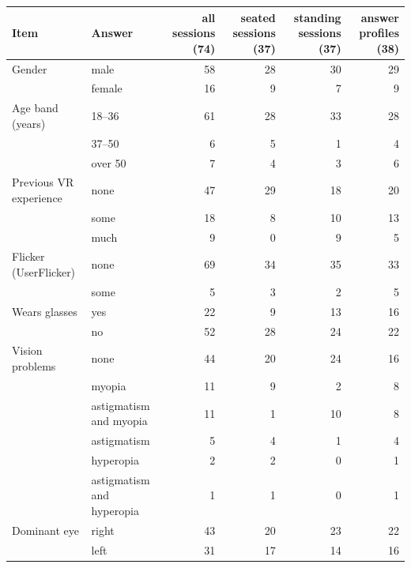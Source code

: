 \begin{tabular}{llrrrr}
\toprule
Item & Answer & all sessions (74) & seated sessions (37) & standing sessions (37) & answer profiles (38) \\
\midrule
Gender & male & 58 & 28 & 30 & 29 \\
 & female & 16 & 9 & 7 & 9 \\
Age band (years) & 18–36 & 61 & 28 & 33 & 28 \\
 & 37–50 & 6 & 5 & 1 & 4 \\
 & over 50 & 7 & 4 & 3 & 6 \\
Previous VR experience & none & 47 & 29 & 18 & 20 \\
 & some & 18 & 8 & 10 & 13 \\
 & much & 9 & 0 & 9 & 5 \\
Flicker (UserFlicker) & none & 69 & 34 & 35 & 33 \\
 & some & 5 & 3 & 2 & 5 \\
Wears glasses & yes & 22 & 9 & 13 & 16 \\
 & no & 52 & 28 & 24 & 22 \\
Vision problems & none & 44 & 20 & 24 & 16 \\
 & myopia & 11 & 9 & 2 & 8 \\
 & astigmatism and myopia & 11 & 1 & 10 & 8 \\
 & astigmatism & 5 & 4 & 1 & 4 \\
 & hyperopia & 2 & 2 & 0 & 1 \\
 & astigmatism and hyperopia & 1 & 1 & 0 & 1 \\
Dominant eye & right & 43 & 20 & 23 & 22 \\
 & left & 31 & 17 & 14 & 16 \\
\bottomrule
\end{tabular}
